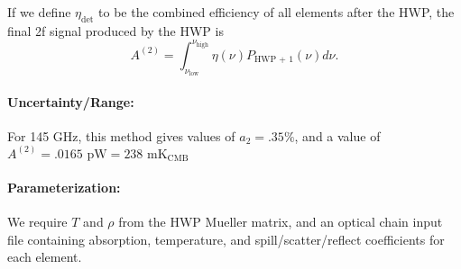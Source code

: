 If we define $\eta_\text{det}$ to be the combined efficiency of all elements after the HWP,
the final 2f signal produced by the HWP is 
\[
A^{(2)} = \int_{\nu_\text{low}}^{\nu_\text{high}} \eta(\nu) P_\text{HWP + 1}(\nu) d\nu.
\]
\paragraph{Uncertainty/Range:}
For 145 GHz, this method gives values of $a_2 = .35\%$, and a value of 
$A^{(2)} = .0165 \text{ pW} = 238 \text{ mK}_\text{CMB}$

\paragraph{Parameterization:}
We require $T$ and $\rho$ from the HWP Mueller matrix\cite{Salatino16}, and an optical chain input file containing
absorption, temperature, and spill/scatter/reflect coefficients for each element.

